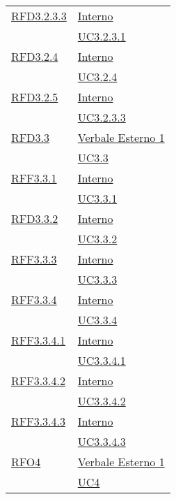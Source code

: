 \begin{longtable}{|>{\centering}m{5cm}|m{5cm}<{\centering}|}
\hyperlink{RFD3.2.3.3}{RFD3.2.3.3} & \hyperlink{Interno}{Interno}\\
& \hyperref[UC3.2.3.1]{UC3.2.3.1}\\ \hline

\hyperlink{RFD3.2.4}{RFD3.2.4} & \hyperlink{Interno}{Interno}\\
& \hyperref[UC3.2.4]{UC3.2.4}\\ \hline

\hyperlink{RFD3.2.5}{RFD3.2.5} & \hyperlink{Interno}{Interno}\\
& \hyperref[UC3.2.3.3]{UC3.2.3.3}\\ \hline

\hyperlink{RFD3.3}{RFD3.3} & \hyperlink{Verbale Esterno 1}{Verbale Esterno 1}\\
& \hyperref[UC3.3]{UC3.3}\\ \hline

\hyperlink{RFF3.3.1}{RFF3.3.1} & \hyperlink{Interno}{Interno}\\
& \hyperref[UC3.3.1]{UC3.3.1}\\ \hline

\hyperlink{RFD3.3.2}{RFD3.3.2} & \hyperlink{Interno}{Interno}\\
& \hyperref[UC3.3.2]{UC3.3.2}\\ \hline

\hyperlink{RFF3.3.3}{RFF3.3.3} & \hyperlink{Interno}{Interno}\\
& \hyperref[UC3.3.3]{UC3.3.3}\\ \hline

\hyperlink{RFF3.3.4}{RFF3.3.4} & \hyperlink{Interno}{Interno}\\
& \hyperref[UC3.3.4]{UC3.3.4}\\ \hline

\hyperlink{RFF3.3.4.1}{RFF3.3.4.1} & \hyperlink{Interno}{Interno}\\
& \hyperref[UC3.3.4.1]{UC3.3.4.1}\\ \hline

\hyperlink{RFF3.3.4.2}{RFF3.3.4.2} & \hyperlink{Interno}{Interno}\\
& \hyperref[UC3.3.4.2]{UC3.3.4.2}\\ \hline

\hyperlink{RFF3.3.4.3}{RFF3.3.4.3} & \hyperlink{Interno}{Interno}\\
& \hyperref[UC3.3.4.3]{UC3.3.4.3}\\ \hline

\hyperlink{RFO4}{RFO4} & \hyperlink{Verbale Esterno 1}{Verbale Esterno 1}\\
& \hyperref[UC4]{UC4}\\ \hline


\end{longtable}
